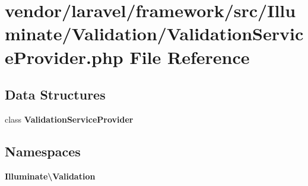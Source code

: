 \section{vendor/laravel/framework/src/\+Illuminate/\+Validation/\+Validation\+Service\+Provider.php File Reference}
\label{_validation_service_provider_8php}
\subsection*{Data Structures}
\begin{DoxyCompactItemize}
\item 
class {\bf Validation\+Service\+Provider}
\end{DoxyCompactItemize}
\subsection*{Namespaces}
\begin{DoxyCompactItemize}
\item 
 {\bf Illuminate\textbackslash{}\+Validation}
\end{DoxyCompactItemize}
